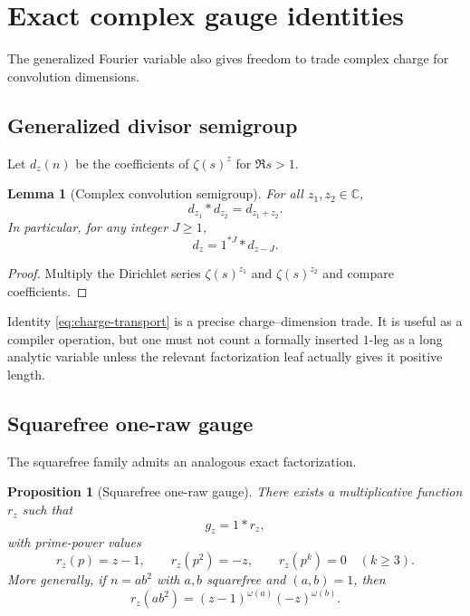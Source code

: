 \documentclass[11pt]{article}
\newtheorem{lemma}[theorem]{Lemma}
\newtheorem{proposition}[theorem]{Proposition}
\theoremstyle{definition}
\theoremstyle{remark}
\newcommand{\1}{\mathbf 1}
\begin{document}
\section{Exact complex gauge identities}\label{sec:gauges}

The generalized Fourier variable also gives freedom to trade complex charge for convolution dimensions.

\subsection{Generalized divisor semigroup}

Let $d_z(n)$ be the coefficients of $\zeta(s)^z$ for $\Re s>1$.

\begin{lemma}[Complex convolution semigroup]\label{lem:dz-semigroup}
For all $z_1,z_2\in\mathbb C$,
\begin{equation}\label{eq:dz-semigroup}
d_{z_1}*d_{z_2}=d_{z_1+z_2}.
\end{equation}
In particular, for any integer $J\ge1$,
\begin{equation}\label{eq:charge-transport}
d_z=1^{*J}*d_{z-J}.
\end{equation}
\end{lemma}

\begin{proof}
Multiply the Dirichlet series $\zeta(s)^{z_1}$ and $\zeta(s)^{z_2}$ and compare coefficients.
\end{proof}

Identity \eqref{eq:charge-transport} is a precise charge--dimension trade.  It is useful as a compiler operation, but one must not count a formally inserted $1$-leg as a long analytic variable unless the relevant factorization leaf actually gives it positive length.

\subsection{Squarefree one-raw gauge}

The squarefree family admits an analogous exact factorization.

\begin{proposition}[Squarefree one-raw gauge]\label{prop:squarefree-gauge}
There exists a multiplicative function $r_z$ such that
\begin{equation}\label{eq:gz-one-raw}
g_z=1*r_z,
\end{equation}
with prime-power values
\begin{equation}\label{eq:rz-local}
r_z(p)=z-1,
\qquad
r_z(p^2)=-z,
\qquad
r_z(p^k)=0\quad(k\ge3).
\end{equation}
More generally, if $n=ab^2$ with $a,b$ squarefree and $(a,b)=1$, then
\begin{equation}\label{eq:rz-ab2}
r_z(ab^2)=(z-1)^{\omega(a)}(-z)^{\omega(b)}.
\end{equation}
\end{proposition}
\end{document}
